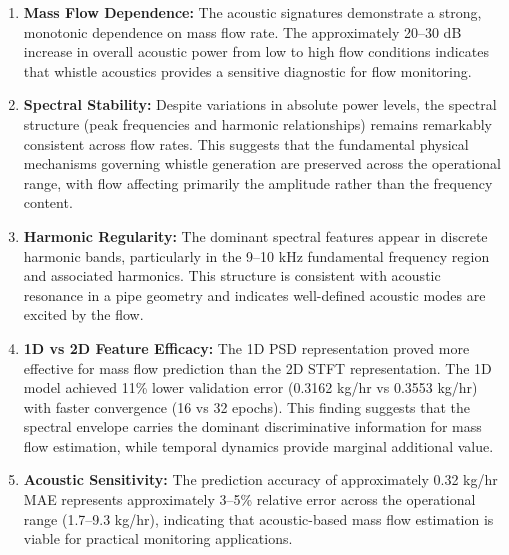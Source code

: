 \begin{enumerate}
    \item \textbf{Mass Flow Dependence:} The acoustic signatures demonstrate a strong, monotonic dependence on mass flow rate. The approximately 20--30 dB increase in overall acoustic power from low to high flow conditions indicates that whistle acoustics provides a sensitive diagnostic for flow monitoring.
    
    \item \textbf{Spectral Stability:} Despite variations in absolute power levels, the spectral structure (peak frequencies and harmonic relationships) remains remarkably consistent across flow rates. This suggests that the fundamental physical mechanisms governing whistle generation are preserved across the operational range, with flow affecting primarily the amplitude rather than the frequency content.
    
    \item \textbf{Harmonic Regularity:} The dominant spectral features appear in discrete harmonic bands, particularly in the 9--10 kHz fundamental frequency region and associated harmonics. This structure is consistent with acoustic resonance in a pipe geometry and indicates well-defined acoustic modes are excited by the flow.
    
    \item \textbf{1D vs 2D Feature Efficacy:} The 1D PSD representation proved more effective for mass flow prediction than the 2D STFT representation. The 1D model achieved 11\% lower validation error (0.3162 kg/hr vs 0.3553 kg/hr) with faster convergence (16 vs 32 epochs). This finding suggests that the spectral envelope carries the dominant discriminative information for mass flow estimation, while temporal dynamics provide marginal additional value.
    
    \item \textbf{Acoustic Sensitivity:} The prediction accuracy of approximately 0.32 kg/hr MAE represents approximately 3--5\% relative error across the operational range (1.7--9.3 kg/hr), indicating that acoustic-based mass flow estimation is viable for practical monitoring applications.
\end{enumerate}
